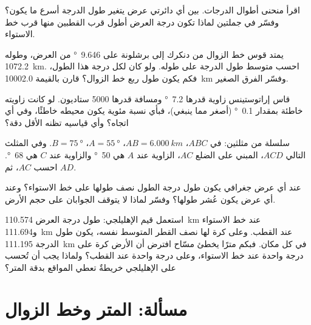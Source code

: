 \begin{exercise}[$\star\star$]\label{exo:g10:measuring-the-earth:10}
اقرأ منحنى أطوال الدرجات. بين أي دائرتي عرض يتغير طول الدرجة أسرع ما يكون؟
وفسّر في جملتين لماذا تكون درجة العرض أطول قرب القطبين منها قرب خط
الاستواء.
\end{exercise}

\begin{exercise}[$\star\star$]\label{exo:g10:measuring-the-earth:11}
يمتد قوس خط الزوال من دنكرك إلى برشلونة على \qty{9.646}{\degree} من العرض،
وطوله \qty{1072.2}{km}. احسب متوسط طول الدرجة على طوله. ولو كان لكل درجة هذا
الطول، فكم يكون طول ربع خط الزوال؟ قارن بالقيمة \qty{10002.0}{km} وفسّر
الفرق الصغير.
\end{exercise}

\begin{exercise}[$\star\star\star$]\label{exo:g10:measuring-the-earth:12}
قاس إراتوستينس زاوية قدرها \qty{7.2}{\degree} ومسافة قدرها 5000 ستاديون. لو
كانت زاويته خاطئة بمقدار \qty{0.1}{\degree} (أصغر مما ينبغي)، فبأي نسبة مئوية
يكون محيطه خاطئًا، وفي أي اتجاه؟ وأي قياسيه تظنه الأقل
دقة؟
\end{exercise}

\begin{exercise}[$\star\star\star$]\label{exo:g10:measuring-the-earth:13}
سلسلة من مثلثين: في $ABC$، $AB = \qty{6.000}{km}$،
$A = \qty{55}{\degree}$، $B = \qty{75}{\degree}$. وفي المثلث التالي $ACD$،
المبني على الضلع $AC$، الزاوية عند $A$ هي \qty{50}{\degree} والزاوية
عند $C$ هي \qty{68}{\degree}. احسب $AC$، ثم $AD$.
\end{exercise}

\begin{exercise}[$\star\star\star$]\label{exo:g10:measuring-the-earth:14}
عند أي عرض جغرافي يكون طول درجة الطول نصف طولها على خط الاستواء؟ وعند أي عرض
يكون عُشر طولها؟ وفسّر لماذا لا يتوقف الجوابان على حجم
الأرض.
\end{exercise}

\begin{exercise}[$\star\star\star$]\label{exo:g10:measuring-the-earth:15}
استعمل قيم الإهليلجي: طول درجة العرض \qty{110.574}{km} عند خط الاستواء
و\qty{111.694}{km} عند القطب. وعلى كرة لها نصف القطر المتوسط نفسه، يكون طول
الدرجة \qty{111.195}{km} في كل مكان. فبكم مترًا يخطئ مسّاح افترض أن الأرض كرة
على درجة واحدة عند خط الاستواء، وعلى درجة واحدة عند القطب؟ ولماذا يجب أن تُحسب
على الإهليلجي خريطةٌ تعطي المواقع بدقة المتر؟
\end{exercise}

\section{مسألة: المتر وخط الزوال}

